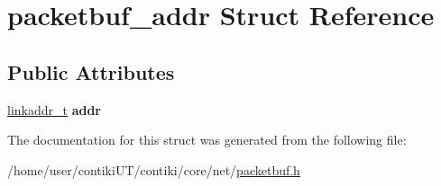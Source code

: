 \hypertarget{structpacketbuf__addr}{}\section{packetbuf\+\_\+addr Struct Reference}
\label{structpacketbuf__addr}
\subsection*{Public Attributes}
\begin{DoxyCompactItemize}
\item 
\hypertarget{structpacketbuf__addr_a2b3f73e4a5818276e1dc2de49be192c4}{}\hyperlink{unionlinkaddr__t}{linkaddr\+\_\+t} {\bfseries addr}\label{structpacketbuf__addr_a2b3f73e4a5818276e1dc2de49be192c4}

\end{DoxyCompactItemize}


The documentation for this struct was generated from the following file\+:\begin{DoxyCompactItemize}
\item 
/home/user/contiki\+U\+T/contiki/core/net/\hyperlink{packetbuf_8h}{packetbuf.\+h}\end{DoxyCompactItemize}
